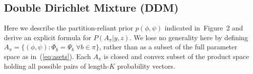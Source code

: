 \documentclass[aoas,preprint]{imsart}
\begin{document}




\subsection{Double Dirichlet Mixture (DDM)}




Here we describe the partition-reliant prior $p(\phi,\psi)$ indicated in~Figure~2 and derive an explicit
formula for $P(A_\pi|y,z)$.   We lose no generality here by defining
$A_\pi = \{ (\phi,\psi): \Phi_b = \Psi_b \;  \forall b \in \pi \}$, rather than as a subset of the full
parameter space as in~(\ref{eq:asets}).   Each $A_\pi$ is closed and convex subset of the product space
holding all possible pairs of length-$K$ probability vectors.
\end{document}
